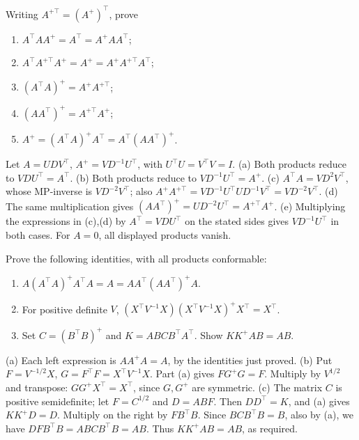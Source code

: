 \begin{problem}\label{ex:10:mp-identities}
Writing \(A^{+\top}=(A^+)^\top\), prove
\begin{enumerate}
\item \(A^\top AA^+=A^\top=A^+AA^\top\);
\item \(A^\top A^{+\top}A^+=A^+=A^+A^{+\top}A^\top\);
\item \((A^\top A)^+=A^+A^{+\top}\);
\item \((AA^\top)^+=A^{+\top}A^+\);
\item \(A^+=(A^\top A)^+A^\top=A^\top(AA^\top)^+\).
\end{enumerate}
\end{problem}
\begin{solution}
Let \(A=UDV^\top\), \(A^+=VD^{-1}U^\top\), with \(U^\top U=V^\top V=I\).
(a) Both products reduce to \(VDU^\top=A^\top\).
(b) Both products reduce to \(VD^{-1}U^\top=A^+\).
(c) \(A^\top A=VD^2V^\top\), whose MP-inverse is \(VD^{-2}V^\top\);
also \(A^+A^{+\top}=VD^{-1}U^\top UD^{-1}V^\top=VD^{-2}V^\top\).
(d) The same multiplication gives \((AA^\top)^+=UD^{-2}U^\top
=A^{+\top}A^+\).
(e) Multiplying the expressions in (c),(d) by \(A^\top=VDU^\top\)
on the stated sides gives \(VD^{-1}U^\top\) in both cases.
For \(A=0\), all displayed products vanish.
\end{solution}

\begin{problem}\label{ex:10:mp-composite}
Prove the following identities, with all products conformable:
\begin{enumerate}
\item \(A(A^\top A)^+A^\top A=A=AA^\top(AA^\top)^+A\).
\item For positive definite \(V\),
\((X^\top V^{-1}X)(X^\top V^{-1}X)^+X^\top=X^\top\).
\item Set \(C=(B^\top B)^+\) and \(K=ABCB^\top A^\top\).
Show \(KK^+AB=AB\).
\end{enumerate}
\end{problem}
\begin{solution}
(a) Each left expression is \(AA^+A=A\), by the identities just proved.
(b) Put \(F=V^{-1/2}X\), \(G=F^\top F=X^\top V^{-1}X\).
Part (a) gives \(FG^+G=F\). Multiply by \(V^{1/2}\) and transpose:
\(GG^+X^\top=X^\top\), since \(G,G^+\) are symmetric.
(c) The matrix \(C\) is positive semidefinite; let \(F=C^{1/2}\) and
\(D=ABF\). Then \(DD^\top=K\), and (a) gives \(KK^+D=D\).
Multiply on the right by \(FB^\top B\). Since
\(B C B^\top B=B\), also by (a), we have
\(DFB^\top B=ABCB^\top B=AB\). Thus \(KK^+AB=AB\), as required.
\end{solution}

